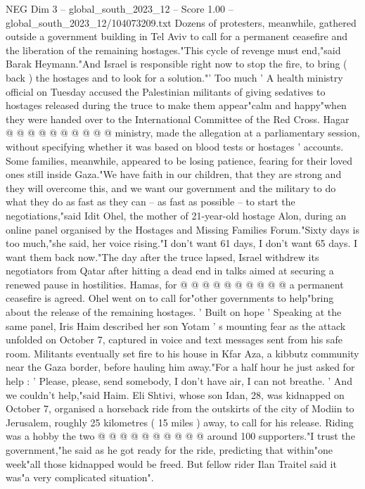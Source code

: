 \begin{textsample}{NEG Dim 3 – global\_south\_2023\_12 – Score 1.00 – global\_south\_2023\_12/104073209.txt}
Dozens of protesters, meanwhile, gathered outside a government building in Tel Aviv to call for a permanent ceasefire and the liberation of the remaining hostages."This cycle of revenge must end,"said Barak Heymann."And Israel is responsible right now to stop the fire, to bring ( back ) the hostages and to look for a solution."' Too much ' A health ministry official on Tuesday accused the Palestinian militants of giving sedatives to hostages released during the truce to make them appear"calm and happy"when they were handed over to the International Committee of the Red Cross.
Hagar @ @ @ @ @ @ @ @ @ @ ministry, made the allegation at a parliamentary session, without specifying whether it was based on blood tests or hostages ' accounts.
Some families, meanwhile, appeared to be losing patience, fearing for their loved ones still inside Gaza."We have faith in our children, that they are strong and they will overcome this, and we want our government and the military to do what they do as fast as they can -- as fast as possible -- to start the negotiations,"said Idit Ohel, the mother of 21-year-old hostage Alon, during an online panel organised by the Hostages and Missing Families Forum."Sixty days is too much,"she said, her voice rising."I don't want 61 days, I don't want 65 days.
I want them back now."The day after the truce lapsed, Israel withdrew its negotiators from Qatar after hitting a dead end in talks aimed at securing a renewed pause in hostilities.
Hamas, for @ @ @ @ @ @ @ @ @ @ a permanent ceasefire is agreed.
Ohel went on to call for"other governments to help"bring about the release of the remaining hostages. ' Built on hope ' Speaking at the same panel, Iris Haim described her son Yotam ' s mounting fear as the attack unfolded on October 7, captured in voice and text messages sent from his safe room.
Militants eventually set fire to his house in Kfar Aza, a kibbutz community near the Gaza border, before hauling him away."For a half hour he just asked for help : ' Please, please, send somebody, I don't have air, I can not breathe. ' And we couldn't help,"said Haim.
Eli Shtivi, whose son Idan, 28, was kidnapped on October 7, organised a horseback ride from the outskirts of the city of Modiin to Jerusalem, roughly 25 kilometres ( 15 miles ) away, to call for his release.
Riding was a hobby the two @ @ @ @ @ @ @ @ @ @ around 100 supporters."I trust the government,"he said as he got ready for the ride, predicting that within"one week"all those kidnapped would be freed.
But fellow rider Ilan Traitel said it was"a very complicated situation".

\end{textsample}
